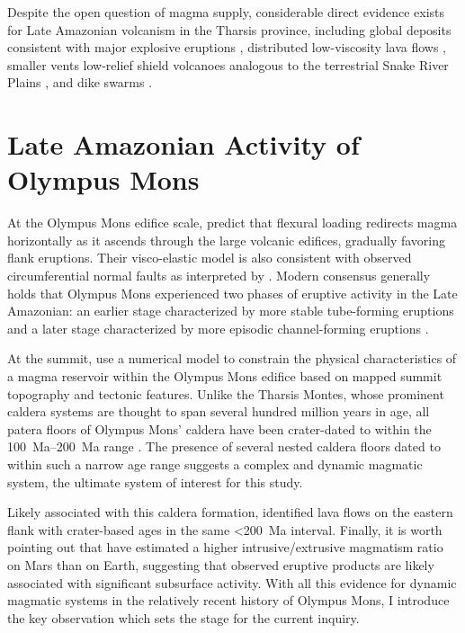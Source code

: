 Despite the open question of magma supply, considerable direct evidence exists for Late Amazonian volcanism in the Tharsis province, including global deposits consistent with major explosive eruptions \parencite{hynek_explosive_2003}, distributed low-viscosity lava flows \parencite{hauber_very_2011}, smaller vents \parencite{wilson_fissure_2009,richardson_small_2021} low-relief shield volcanoes analogous to the terrestrial Snake River Plains \parencite{hauber_topography_2009}, and dike swarms \parencite{pieterek_late_2022}.

\section{Late Amazonian Activity of Olympus Mons}

At the Olympus Mons edifice scale, \textcite{mcgovern_state_1993} predict that flexural loading redirects magma horizontally as it ascends through the large volcanic edifices, gradually favoring flank eruptions. Their visco-elastic model is also consistent with observed circumferential normal faults as interpreted by \textcite{thomas_flank_1990}. Modern consensus generally holds that Olympus Mons experienced two phases of eruptive activity in the Late Amazonian: an earlier stage characterized by more stable tube-forming eruptions and a later stage characterized by more episodic channel-forming eruptions \parencite{bleacher_olympus_2007,peters_flank_2017}.

At the summit, \textcite{zuber_caldera_1992} use a numerical model to constrain the physical characteristics of a magma reservoir within the Olympus Mons edifice based on mapped summit topography and tectonic features. Unlike the Tharsis Montes, whose prominent caldera systems are thought to span several hundred million years in age, all patera floors of Olympus Mons' caldera have been crater-dated to within the \qtyrange{100}{200}{Ma} range \parencite{neukum_recent_2004}. The presence of several nested caldera floors dated to within such a narrow age range suggests a complex and dynamic magmatic system, the ultimate system of interest for this study.

Likely associated with this caldera formation, \textcite{basilevsky_geologically_2006} identified lava flows on the eastern flank with crater-based ages in the same \qty{<200}{Ma} interval. Finally, it is worth pointing out that \textcite[][and others]{black_eruptibility_2016} have estimated a higher intrusive/extrusive magmatism ratio on Mars than on Earth, suggesting that observed eruptive products are likely associated with significant subsurface activity. With all this evidence for dynamic magmatic systems in the relatively recent history of Olympus Mons, I introduce the key observation which sets the stage for the current inquiry.  

